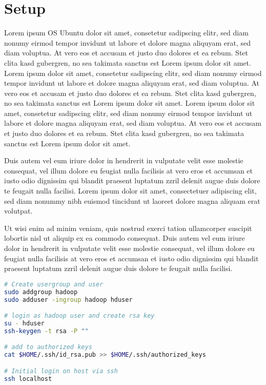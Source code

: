 
\chapter{Setup}\label{cha:Setup}
Lorem ipsum \ac{OS} Ubuntu  dolor sit amet, consetetur sadipscing elitr, sed diam nonumy eirmod tempor invidunt ut labore et dolore magna aliquyam erat, sed diam voluptua. At vero eos et accusam et justo duo dolores et ea rebum. Stet clita kasd gubergren, no sea takimata sanctus est Lorem ipsum dolor sit amet. Lorem ipsum dolor sit amet, consetetur sadipscing elitr, sed diam nonumy eirmod tempor invidunt ut labore et dolore magna aliquyam erat, sed diam voluptua. At vero eos et accusam et justo duo dolores et ea rebum. Stet clita kasd gubergren, no sea takimata sanctus est Lorem ipsum dolor sit amet. Lorem ipsum dolor sit amet, consetetur sadipscing elitr, sed diam nonumy eirmod tempor invidunt ut labore et dolore magna aliquyam erat, sed diam voluptua. At vero eos et accusam et justo duo dolores et ea rebum. Stet clita kasd gubergren, no sea takimata sanctus est Lorem ipsum dolor sit amet. 

Duis autem vel eum iriure dolor in hendrerit in vulputate velit esse molestie consequat, vel illum dolore eu feugiat nulla facilisis at vero eros et accumsan et iusto odio dignissim qui blandit praesent luptatum zzril delenit augue duis dolore te feugait nulla facilisi. Lorem ipsum dolor sit amet, consectetuer adipiscing elit, sed diam nonummy nibh euismod tincidunt ut laoreet dolore magna aliquam erat volutpat. 

Ut wisi enim ad minim veniam, quis nostrud exerci tation ullamcorper suscipit lobortis nisl ut aliquip ex ea commodo consequat. Duis autem vel eum iriure dolor in hendrerit in vulputate velit esse molestie consequat, vel illum dolore eu feugiat nulla facilisis at vero eros et accumsan et iusto odio dignissim qui blandit praesent luptatum zzril delenit augue duis dolore te feugait nulla facilisi. 

\newpage
\begin{lstlisting}[language=bash, caption={Konfiguration des Hadoop Users}, label=lis:KonfHadoopUser]
# Create usergroup and user
sudo addgroup hadoop
sudo adduser -ingroup hadoop hduser

# login as hadoop user and create rsa key
su - hduser
ssh-keygen -t rsa -P ""

# add to authorized keys
cat $HOME/.ssh/id_rsa.pub >> $HOME/.ssh/authorized_keys

# Initial login on host via ssh
ssh localhost
\end{lstlisting}

